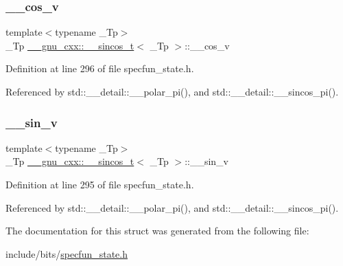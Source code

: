 \subsubsection{\texorpdfstring{\+\_\+\+\_\+cos\+\_\+v}{\_\_cos\_v}}
{\footnotesize\ttfamily template$<$typename \+\_\+\+Tp$>$ \\
\+\_\+\+Tp \hyperlink{struct____gnu__cxx_1_1____sincos__t}{\+\_\+\+\_\+gnu\+\_\+cxx\+::\+\_\+\+\_\+sincos\+\_\+t}$<$ \+\_\+\+Tp $>$\+::\+\_\+\+\_\+cos\+\_\+v}



Definition at line 296 of file specfun\+\_\+state.\+h.



Referenced by std\+::\+\_\+\+\_\+detail\+::\+\_\+\+\_\+polar\+\_\+pi(), and std\+::\+\_\+\+\_\+detail\+::\+\_\+\+\_\+sincos\+\_\+pi().

\mbox{\label{struct____gnu__cxx_1_1____sincos__t_a22a21d9a5658097549cbca39b891fd27}} 
\subsubsection{\texorpdfstring{\+\_\+\+\_\+sin\+\_\+v}{\_\_sin\_v}}
{\footnotesize\ttfamily template$<$typename \+\_\+\+Tp$>$ \\
\+\_\+\+Tp \hyperlink{struct____gnu__cxx_1_1____sincos__t}{\+\_\+\+\_\+gnu\+\_\+cxx\+::\+\_\+\+\_\+sincos\+\_\+t}$<$ \+\_\+\+Tp $>$\+::\+\_\+\+\_\+sin\+\_\+v}



Definition at line 295 of file specfun\+\_\+state.\+h.



Referenced by std\+::\+\_\+\+\_\+detail\+::\+\_\+\+\_\+polar\+\_\+pi(), and std\+::\+\_\+\+\_\+detail\+::\+\_\+\+\_\+sincos\+\_\+pi().



The documentation for this struct was generated from the following file\+:\begin{DoxyCompactItemize}
\item 
include/bits/\hyperlink{specfun__state_8h}{specfun\+\_\+state.\+h}\end{DoxyCompactItemize}
